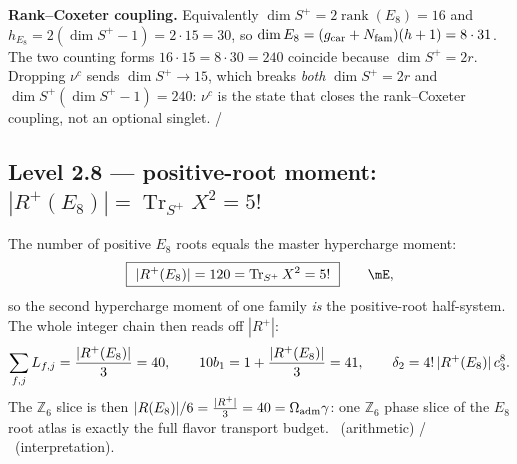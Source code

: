 \noindent\textbf{Rank--Coxeter coupling.} Equivalently $\dim S^+=2\operatorname{rank}(E_8)=16$ and
$h_{E_8}=2(\dim S^+-1)=2\cdot15=30$, so $\dim E_8=(g_{\mathrm{car}}+N_{\mathrm{fam}})(h+1)=8\cdot31$. The two counting forms
$16\cdot15=8\cdot30=240$ coincide because $\dim S^+=2r$. Dropping $\nu^c$ sends $\dim S^+\to15$, which
breaks \emph{both} $\dim S^+=2r$ and $\dim S^+(\dim S^+-1)=240$: $\nu^c$ is the state that closes the
rank--Coxeter coupling, not an optional singlet. \mE/\mC

\subsection{Level 2.8 --- positive-root moment: $|R^+(E_8)|=\operatorname{Tr}_{S^+}X^2=5!$}
The number of positive $E_8$ roots equals the master hypercharge moment:
\begin{equation}
  \boxed{\ |R^+(E_8)|=120=\operatorname{Tr}_{S^+}X^2=5!\ }\qquad\mE,
\end{equation}
so the second hypercharge moment of one family \emph{is} the positive-root half-system. The whole
integer chain then reads off $|R^+|$:
\begin{equation}
  \sum_{f,j}L_{f,j}=\frac{|R^+(E_8)|}{3}=40,\qquad
  10b_1=1+\frac{|R^+(E_8)|}{3}=41,\qquad
  \delta_2=4!\,|R^+(E_8)|\,c_3^8 .
\end{equation}
The $\mathbb Z_6$ slice is then $|R(E_8)|/6=\tfrac{|R^+|}{3}=40=\Omega_{\mathrm{adm}}\gamma$: one $\mathbb Z_6$ phase
slice of the $E_8$ root atlas is exactly the full flavor transport budget. \mE\ (arithmetic) / \mC\
(interpretation).


